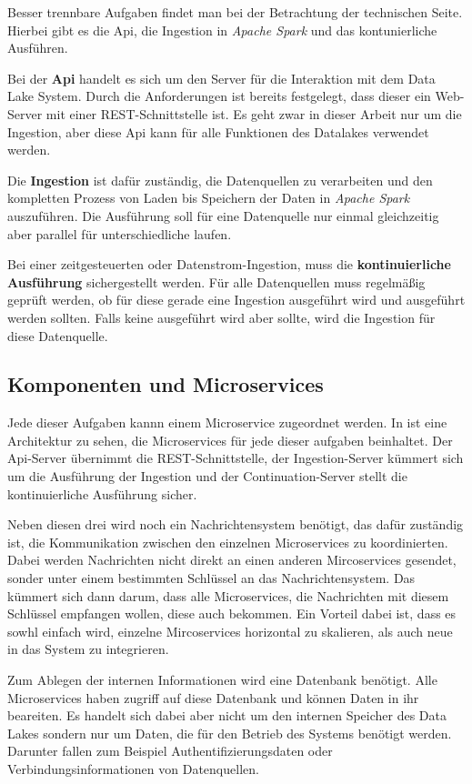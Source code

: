 Besser trennbare Aufgaben findet man bei der Betrachtung der technischen Seite.
Hierbei gibt es die Api, die Ingestion in \textit{Apache Spark} und das kontunierliche Ausführen.

Bei der \textbf{Api} handelt es sich um den Server für die Interaktion mit dem Data Lake System.
Durch die Anforderungen ist bereits festgelegt, dass dieser ein Web-Server mit einer REST-Schnittstelle ist.
Es geht zwar in dieser Arbeit nur um die Ingestion, aber diese Api kann für alle Funktionen des Datalakes verwendet werden.

Die \textbf{Ingestion} ist dafür zuständig, die Datenquellen zu verarbeiten und den kompletten Prozess von Laden bis Speichern der Daten in \textit{Apache Spark} auszuführen.
Die Ausführung soll für eine Datenquelle nur einmal gleichzeitig aber parallel für unterschiedliche laufen.

Bei einer zeitgesteuerten oder Datenstrom-Ingestion, muss die \textbf{kontinuierliche Ausführung} sichergestellt werden.
Für alle Datenquellen muss regelmäßig geprüft werden, ob für diese gerade eine Ingestion ausgeführt wird und ausgeführt werden sollten.
Falls keine ausgeführt wird aber sollte, wird die Ingestion für diese Datenquelle.

\subsection{Komponenten und Microservices}
Jede dieser Aufgaben kannn einem Microservice zugeordnet werden.
In  ist eine Architektur zu sehen, die Microservices für jede dieser aufgaben beinhaltet.
Der Api-Server übernimmt die REST-Schnittstelle, der Ingestion-Server kümmert sich um die Ausführung der Ingestion und der Continuation-Server stellt die kontinuierliche Ausführung sicher.

Neben diesen drei wird noch ein Nachrichtensystem benötigt, das dafür zuständig ist, die Kommunikation zwischen den  einzelnen Microservices zu koordinierten.
Dabei werden Nachrichten nicht direkt an einen anderen Mircoservices gesendet, sonder unter einem bestimmten Schlüssel an das Nachrichtensystem.
Das kümmert sich dann darum, dass alle Microservices, die Nachrichten mit diesem Schlüssel empfangen wollen, diese auch bekommen.
Ein Vorteil dabei ist, dass es sowhl einfach wird, einzelne Mircoservices horizontal zu skalieren, als auch neue in das System zu integrieren.

Zum Ablegen der internen Informationen wird eine Datenbank benötigt.
Alle Microservices haben zugriff auf diese Datenbank und können Daten in ihr beareiten.
Es handelt sich dabei aber nicht um den internen Speicher des Data Lakes sondern nur um Daten, die für den Betrieb des Systems benötigt werden.
Darunter fallen zum Beispiel Authentifizierungsdaten oder Verbindungsinformationen von Datenquellen.

